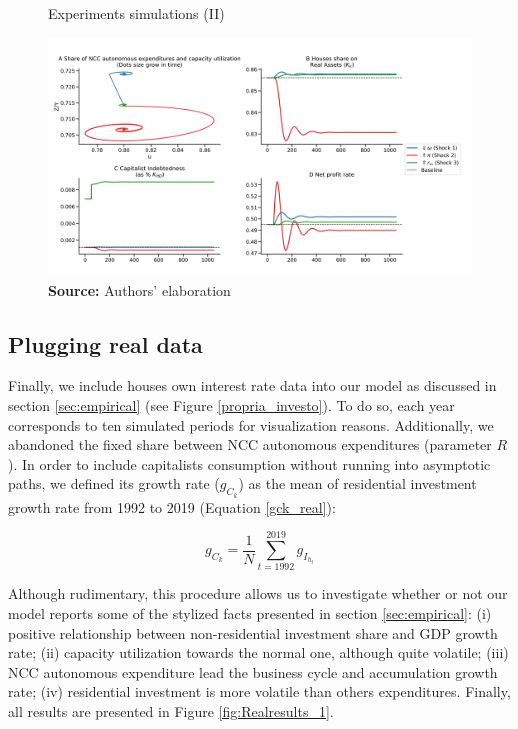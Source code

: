 \documentclass[11pt]{article}
\begin{document}
\begin{figure}[htb]
	\centering
	\caption{Experiments simulations (II)}
	\label{fig:results_2}
	\includegraphics[width=.8\textwidth]{./figs/Compared_Shocks_2.png}
	\caption*{\textbf{Source:} Authors' elaboration}
\end{figure}



\subsection{Plugging real data}
\label{sec:orga1be380}
\label{real_sim}

Finally, we include houses own interest rate data into our model as discussed in section \ref{sec:empirical} (see Figure \ref{propria_investo}).
To do so, each year corresponds to ten simulated periods for visualization reasons.
Additionally, we abandoned the fixed share between NCC autonomous expenditures (parameter \(R\)).
In order to include capitalists consumption without running into asymptotic paths, we defined its growth rate (\(g_{C_k}\)) as the mean of residential investment growth rate from 1992 to 2019 (Equation \ref{gck_real}):

\begin{equation}
  \label{gck_real}
  g_{C_k} = \frac{1}{N} \sum_{t=1992}^{2019} g_{I_{h_{t}}}
\end{equation}


Although rudimentary, this procedure allows us to investigate whether or not our model reports some of the stylized facts presented in section \ref{sec:empirical}:
(i) positive relationship between non-residential investment share and GDP growth rate; (ii) capacity utilization towards the normal one, although quite volatile; (iii) NCC autonomous expenditure lead the business cycle and accumulation growth rate; (iv) residential investment is more volatile than others expenditures.
Finally, all results are presented in Figure \ref{fig:Realresults_1}.
\end{document}
